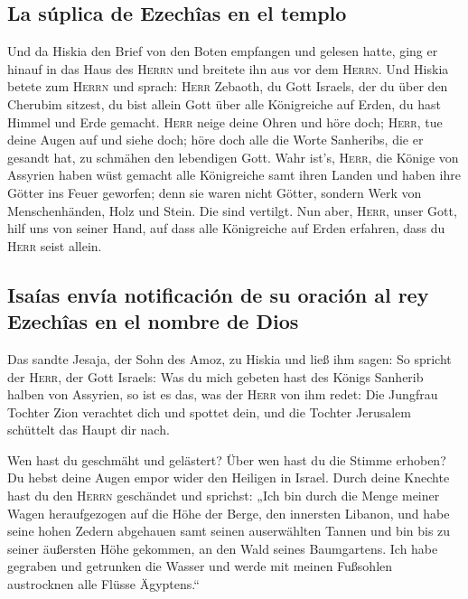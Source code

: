 \hypertarget{la-suxfaplica-de-ezechuxeeas-en-el-templo}{%
\subsection{La súplica de Ezechîas en el
templo}\label{la-suxfaplica-de-ezechuxeeas-en-el-templo}}

 Und da Hiskia den Brief von den Boten empfangen und
gelesen hatte, ging er hinauf in das Haus des \textsc{Herrn} und
breitete ihn aus vor dem \textsc{Herrn}.  Und Hiskia
betete zum \textsc{Herrn} und sprach:  \textsc{Herr}
Zebaoth, du Gott Israels, der du über den Cherubim sitzest, du bist
allein Gott über alle Königreiche auf Erden, du hast Himmel und Erde
gemacht.  \textsc{Herr} neige deine Ohren und höre doch;
\textsc{Herr}, tue deine Augen auf und siehe doch; höre doch alle die
Worte Sanheribs, die er gesandt hat, zu schmähen den lebendigen Gott.
 Wahr ist's, \textsc{Herr}, die Könige von Assyrien haben
wüst gemacht alle Königreiche samt ihren Landen  und
haben ihre Götter ins Feuer geworfen; denn sie waren nicht Götter,
sondern Werk von Menschenhänden, Holz und Stein. Die sind vertilgt.
 Nun aber, \textsc{Herr}, unser Gott, hilf uns von seiner
Hand, auf dass alle Königreiche auf Erden erfahren, dass du
\textsc{Herr} seist allein.

\hypertarget{isauxedas-envuxeda-notificaciuxf3n-de-su-oraciuxf3n-al-rey-ezechuxeeas-en-el-nombre-de-dios}{%
\subsection{Isaías envía notificación de su oración al rey Ezechîas en
el nombre de
Dios}\label{isauxedas-envuxeda-notificaciuxf3n-de-su-oraciuxf3n-al-rey-ezechuxeeas-en-el-nombre-de-dios}}

 Das sandte Jesaja, der Sohn des Amoz, zu Hiskia und ließ
ihm sagen: So spricht der \textsc{Herr}, der Gott Israels: Was du mich
gebeten hast des Königs Sanherib halben von Assyrien,  so
ist es das, was der \textsc{Herr} von ihm redet: Die Jungfrau Tochter
Zion verachtet dich und spottet dein, und die Tochter Jerusalem
schüttelt das Haupt dir nach.

 Wen hast du geschmäht und gelästert? Über wen hast du
die Stimme erhoben? Du hebst deine Augen empor wider den Heiligen in
Israel.  Durch deine Knechte hast du den \textsc{Herrn}
geschändet und sprichst: „Ich bin durch die Menge meiner Wagen
heraufgezogen auf die Höhe der Berge, den innersten Libanon, und habe
seine hohen Zedern abgehauen samt seinen auserwählten Tannen und bin bis
zu seiner äußersten Höhe gekommen, an den Wald seines Baumgartens.
 Ich habe gegraben und getrunken die Wasser und werde mit
meinen Fußsohlen austrocknen alle Flüsse Ägyptens.``

